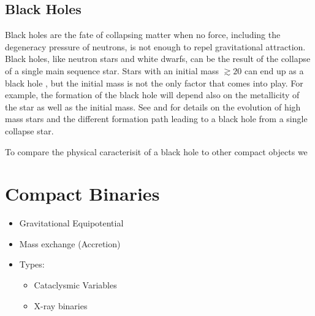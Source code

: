 \subsection{Black Holes}\label{sec:bh}

Black holes are the fate of collapsing matter when no force, including the degeneracy pressure of neutrons, is not enough to repel gravitational attraction. Black holes,  like neutron stars and white dwarfs, can be the result of the collapse of a single main sequence star. Stars with an initial mass $\gtrsim  20$ can end up as a black hole \cite{heger_how_2003}, but the initial mass is not the only factor that comes into play. For example, the formation of the black hole will depend also on the metallicity of the star as well as the initial mass. See \cite{herfer_how_2003} and \citep{brown_evolution_2000} for details on the evolution of high mass stars and the different formation path leading to a black hole from a single collapse star.  

To compare the physical caracterisit of a black hole to other compact objects we





\section[Compact Binaries]{Compact Binaries}\label{sec:cb}


\begin{itemize}
        \item Gravitational Equipotential
        \item Mass exchange (Accretion)
        \item Types:
                \begin{itemize}
                        \item Cataclysmic Variables
                        \item X-ray binaries
                \end{itemize}
            \end{itemize}



